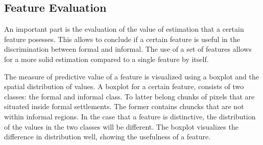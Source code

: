 \subsection{Feature Evaluation}
An important part is the evaluation of the value of estimation that a certain
feature posesses. This allows to conclude if a certain feature is useful in the
discrimination between formal and informal. The use of a set of features allows
for a more solid estimation compared to a single feature by itself. 

The measure of predictive value of a feature is visualized using a boxplot and
the spatial distribution of values. A boxplot for a certain feature, consists
of two classes: the formal and informal class. To latter belong chunks of
pixels that are situated inside formal settlements. The former contains chuncks
that are not within informal regions. In the case that a feature is
distinctive, the distribution of the values in the two classes will be
different. The boxplot visualizes the difference in distribution well, showing
the usefulness of a feature.

